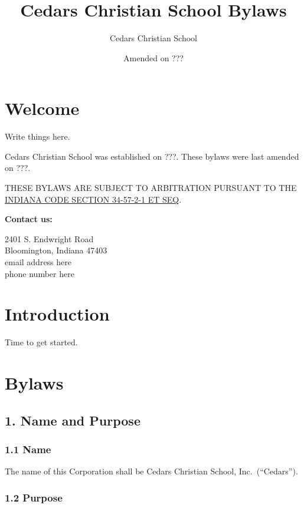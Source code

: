 \documentclass[
]{book}
\title{Cedars Christian School Bylaws}
\author{Cedars Christian School}
\date{Amended on ???}
\begin{document}
\maketitle

{
\hypersetup{linkcolor=}
\setcounter{tocdepth}{1}
\tableofcontents
}
\chapter*{Welcome}\label{welcome}

Write things here.

Cedars Christian School was established on ???. These bylaws were last amended on ???.

THESE BYLAWS ARE SUBJECT TO ARBITRATION PURSUANT TO THE \href{https://iga.in.gov/legislative/laws/2022/ic/titles/034\#34-57-2-1}{INDIANA CODE SECTION 34-57-2-1 ET SEQ}.

\textbf{Contact us:}

2401 S. Endwright Road\\
Bloomington, Indiana 47403\\
email address here\\
phone number here

\mainmatter

\chapter{Introduction}\label{introduction}

Time to get started.

\chapter{Bylaws}\label{bylaws}

\section{1. Name and Purpose}\label{name-and-purpose}

\subsection{1.1 Name}\label{name}

The name of this Corporation shall be Cedars Christian School, Inc.~(``Cedars'').

\subsection{1.2 Purpose}\label{purpose}
\end{document}
